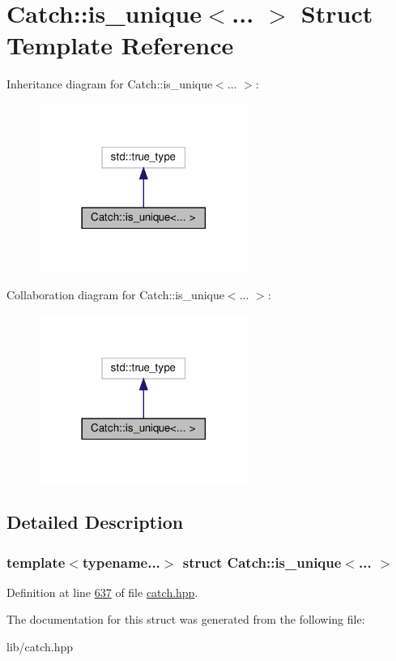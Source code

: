 \hypertarget{structCatch_1_1is__unique}{}\section{Catch\+::is\+\_\+unique$<$... $>$ Struct Template Reference}
\label{structCatch_1_1is__unique}


Inheritance diagram for Catch\+::is\+\_\+unique$<$... $>$\+:\nopagebreak
\begin{figure}[H]
\begin{center}
\leavevmode
\includegraphics[width=194pt]{structCatch_1_1is__unique__inherit__graph}
\end{center}
\end{figure}


Collaboration diagram for Catch\+::is\+\_\+unique$<$... $>$\+:\nopagebreak
\begin{figure}[H]
\begin{center}
\leavevmode
\includegraphics[width=194pt]{structCatch_1_1is__unique__coll__graph}
\end{center}
\end{figure}


\subsection{Detailed Description}
\subsubsection*{template$<$typename...$>$\newline
struct Catch\+::is\+\_\+unique$<$... $>$}



Definition at line \mbox{\hyperlink{catch_8hpp_source_l00637}{637}} of file \mbox{\hyperlink{catch_8hpp_source}{catch.\+hpp}}.



The documentation for this struct was generated from the following file\+:\begin{DoxyCompactItemize}
\item 
lib/catch.\+hpp\end{DoxyCompactItemize}
